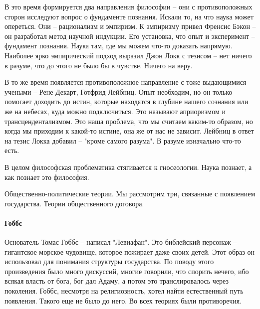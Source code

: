 \documentclass[a4paper, 12pt]{article}
\begin{document}
В это время формируется два направления философии -- они с противоположных сторон исследуют вопрос о фундаменте познания. Искали то, на что наука может опереться. Они -- рационализм и эмпиризм. К эмпиризму привел Френсис Бэкон -- он разработал метод научной индукции. Его установка, что опыт и эксперимент -- фундамент познания. Наука там, где мы можем что-то доказать напрямую. Наиболее ярко эмпирический подход выразил Джон Локк с тезисом -- нет ничего в разуме, что до этого не было бы в чувстве. Ничего на веру. 

В то же время появляется противоположное направление с тоже выдающимися учеными -- Рене Декарт, Готфрид Лейбниц. Опыт необходим, но он только помогает доходить до истин, которые находятся в глубине нашего сознания или же на небесах, куда можно подключиться. Это называют априоризмом и трансцендентализмом. Это наша проблема, что мы считаем каким-то образом, но когда мы приходим к какой-то истине, она же от нас не зависит. Лейбниц в ответ на тезис Локка добавил -- "кроме самого разума". В разуме изначально что-то есть. 

В целом философская проблематика стягивается к гносеологии. Наука познает, а как познает это философия. 

Общественно-политические теории. Мы рассмотрим три, связанные с появлением государства. Теории общественного договора. 

\paragraph{Гоббс}
Основатель Томас Гоббс -- написал "Левиафан". Это библейский персонаж -- гигантское морское чудовище, которое пожирает даже своих детей. Этот образ он использовал для понимания структуры государства. По поводу этого произведения было много дискуссий, многие говорили, что спорить нечего, ибо всякая власть от бога, бог дал Адаму, а потом это транслировалось через поколения. Гоббс, несмотря на религиозность, хотел найти естественный путь появления. Такого еще не было до него. Во всех теориях были противоречия. 
\end{document}
